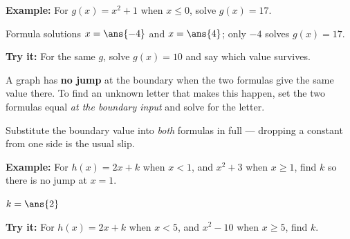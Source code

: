 \documentclass[12pt]{article}
\begin{document}
\begin{examplebox}
\textbf{Example:} \quad For $g(x) = x^2 + 1$ when $x \le 0$, solve $g(x) = 17$.
\par
Formula solutions $x = \ans{-4}$ and $x = \ans{4}$; only $-4$ solves $g(x) = 17$.
\end{examplebox}

\begin{tryitbox}
\textbf{Try it:} \quad For the same $g$, solve $g(x) = 10$ and say which value survives.\\[2pt]
\end{tryitbox}


\begin{formulabox}
A graph has \textbf{no jump} at the boundary when the two formulas give the same value there. To find an unknown letter that makes this happen, set the two formulas equal \emph{at the boundary input} and solve for the letter.\par\smallskip
Substitute the boundary value into \emph{both} formulas in full --- dropping a constant from one side is the usual slip.
\end{formulabox}

\begin{examplebox}
\textbf{Example:} \quad For $h(x) = 2x + k$ when $x < 1$, and $x^2 + 3$ when $x \ge 1$, find $k$ so there is no jump at $x = 1$.
\par
$k = \ans{2}$
\end{examplebox}

\begin{tryitbox}
\textbf{Try it:} \quad For $h(x) = 2x + k$ when $x < 5$, and $x^2 - 10$ when $x \ge 5$, find $k$.\\[2pt]
\end{tryitbox}
\end{document}
